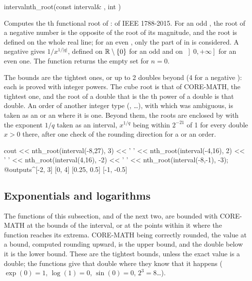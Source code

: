 \documentclass[12pt,a4paper,twoside,openright]{book}
\begin{document}
\begin{deffun}{interval}{nth\_root}{(const interval\& , int )}
  \begin{operation}
  \end{operation}
  Computes the th functional root of :  of
  IEEE 1788-2015. For an odd , the root of a negative number is the
  opposite of the root of its magnitude, and the root is defined on the whole
  real line; for an even , only the part of  in
   is considered.\newinvfive{} A negative  gives
  $1/x^{1/|q|}$, defined on $\mathbb{R}\setminus\{0\}$ for an odd  and on
  $\left]0,+\infty\right]$ for an even one. The function returns the empty
  set for $n=0$.

  The bounds are the tightest ones, or up to 2 doubles beyond (4 for a
  negative ): each is proved with integer powers. The cube root is
  that of CORE-MATH, the tightest one, and the root of a double that is the
  th power of a double is that double. An order of another integer
  type (, \dots), with which  was
  ambiguous, is taken as an  or an  where it is
  one. Beyond them, the roots are enclosed by  with the exponent
  $1/q$ taken as an interval, $x^{1/q}$ being within $2^{-21}$ of 1 for every
  double $x>0$ there, after one check of the rounding direction for a
   or an  order.\newinvfive
\begin{example}
cout << nth_root(interval(-8,27), 3) << ' '
     << nth_root(interval(-4,16), 2) << ' '
     << nth_root(interval(4,16), -2) << ' '
     << nth_root(interval(-8,-1), -3);
@outputs^[-2, 3] [0, 4] [0.25, 0.5] [-1, -0.5]~
\end{example}
\end{deffun}

\subsection{Exponentials and logarithms}\label{sec:arithmetic-exp-log}
%

The functions of this subsection, and of the next two, are bounded with
CORE-MATH at the bounds of the interval, or at the points within it where
the function reaches its extrema. CORE-MATH being correctly rounded, the
value at a bound, computed rounding upward, is the upper bound, and the
double below it is the lower bound. These are the tightest bounds, unless the
exact value is a double; the functions give that double where they know that
it happens ($\exp(0)=1$, $\log(1)=0$, $\sin(0)=0$, $2^3=8$\ldots).\newinvfive
{}%
\end{document}
